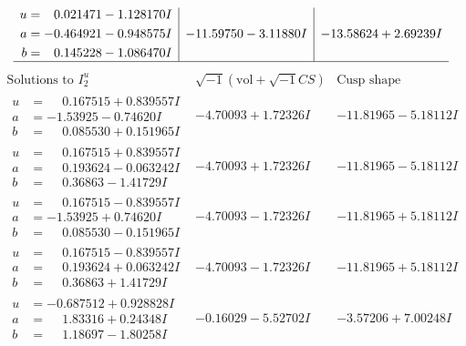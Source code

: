 \documentclass[1p]{elsarticle_modified}
\theoremstyle{definition}
\newcommand{\I}{\sqrt{-1}}
\begin{document}
$$\begin{array}{c|c|c}
\begin{aligned}
u &= \phantom{-}0.021471 - 1.128170 I \\
a &= -0.464921 - 0.948575 I \\
b &= \phantom{-}0.145228 - 1.086470 I\end{aligned}
 & -11.59750 - 3.11880 I & -13.58624 + 2.69239 I\\
 \hline 
 \end{array}$$\newpage$$\begin{array}{c|c|c}  
\text{Solutions to }I^u_{2}& \I (\text{vol} + \sqrt{-1}CS) & \text{Cusp shape}\\
 \hline 
\begin{aligned}
u &= \phantom{-}0.167515 + 0.839557 I \\
a &= -1.53925 - 0.74620 I \\
b &= \phantom{-}0.085530 + 0.151965 I\end{aligned}
 & -4.70093 + 1.72326 I & -11.81965 - 5.18112 I \\ \hline\begin{aligned}
u &= \phantom{-}0.167515 + 0.839557 I \\
a &= \phantom{-}0.193624 - 0.063242 I \\
b &= \phantom{-}0.36863 - 1.41729 I\end{aligned}
 & -4.70093 + 1.72326 I & -11.81965 - 5.18112 I \\ \hline\begin{aligned}
u &= \phantom{-}0.167515 - 0.839557 I \\
a &= -1.53925 + 0.74620 I \\
b &= \phantom{-}0.085530 - 0.151965 I\end{aligned}
 & -4.70093 - 1.72326 I & -11.81965 + 5.18112 I \\ \hline\begin{aligned}
u &= \phantom{-}0.167515 - 0.839557 I \\
a &= \phantom{-}0.193624 + 0.063242 I \\
b &= \phantom{-}0.36863 + 1.41729 I\end{aligned}
 & -4.70093 - 1.72326 I & -11.81965 + 5.18112 I \\ \hline\begin{aligned}
u &= -0.687512 + 0.928828 I \\
a &= \phantom{-}1.83316 + 0.24348 I \\
b &= \phantom{-}1.18697 - 1.80258 I\end{aligned}
 & -0.16029 - 5.52702 I & -3.57206 + 7.00248 I \\ \hline\begin{aligned}

\end{aligned}
\end{array}$$
\end{document}
